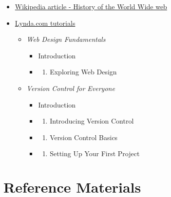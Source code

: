 \documentclass[]{book}
\providecommand{\tightlist}{%
  \setlength{\itemsep}{0pt}\setlength{\parskip}{0pt}}
\begin{document}
\begin{itemize}
\item
  \href{http://en.wikipedia.org/wiki/History_of_the_World_Wide_Web}{Wikipedia
  article - History of the World Wide web}
\item
  \href{http://www.lynda.com/SharedPlaylist/2b710369c9ec4d8c964467225c6610ad?org=unm.edu}{Lynda.com
  tutorials}

  \begin{itemize}
  \tightlist
  \item
    \emph{Web Design Fundamentals}

    \begin{itemize}
    \item
      Introduction
    \item
      \begin{enumerate}
      \def\labelenumi{\arabic{enumi}.}
      \tightlist
      \item
        Exploring Web Design
      \end{enumerate}
    \end{itemize}
  \item
    \emph{Version Control for Everyone}

    \begin{itemize}
    \item
      Introduction
    \item
      \begin{enumerate}
      \def\labelenumi{\arabic{enumi}.}
      \tightlist
      \item
        Introducing Version Control
      \end{enumerate}
    \item
      \begin{enumerate}
      \def\labelenumi{\arabic{enumi}.}
      \setcounter{enumi}{1}
      \tightlist
      \item
        Version Control Basics
      \end{enumerate}
    \item
      \begin{enumerate}
      \def\labelenumi{\arabic{enumi}.}
      \setcounter{enumi}{2}
      \tightlist
      \item
        Setting Up Your First Project
      \end{enumerate}
    \end{itemize}
  \end{itemize}
\end{itemize}

\section{Reference Materials}\label{week01-reference}
\end{document}
